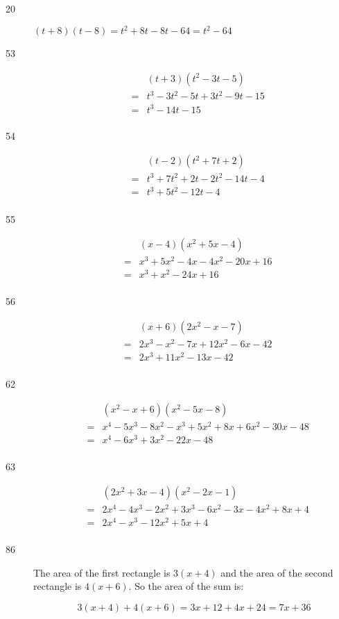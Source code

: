 \documentclass[fleqn,addpoints]{exam}
\begin{document}
\begin{description}
\item[20]
\( (t + 8)(t - 8) = t^2 + 8t - 8t - 64 = t^2 - 64 \)

\item[53]
\begin{eqnarray*}
  && (t + 3)(t^2 - 3t - 5) \\
  &=& t^3 - 3t^2 - 5t + 3t^2 - 9t - 15 \\
  &=& t^3 - 14t - 15 \\
\end{eqnarray*}

\item[54]
\begin{eqnarray*}
  && (t - 2)(t^2 + 7t + 2) \\
  &=& t^3 + 7t^2 + 2t - 2t^2 - 14t - 4 \\
  &=& t^3 + 5t^2 - 12t - 4 \\
\end{eqnarray*}

\item[55]
\begin{eqnarray*}
  && (x - 4)(x^2 + 5x -4) \\
  &=& x^3 + 5x^2 - 4x - 4x^2 - 20x + 16 \\
  &=& x^3 + x^2 - 24x + 16 \\
\end{eqnarray*}

\item[56]
\begin{eqnarray*}
  && (x+6)(2x^2 - x - 7) \\
  &=& 2x^3 - x^2 - 7x + 12x^2 - 6x - 42 \\
  &=& 2x^3 + 11x^2 - 13x - 42 \\
\end{eqnarray*}

\item[62]
\begin{eqnarray*}
  && (x^2 - x + 6)(x^2 - 5x - 8) \\
  &=& x^4 - 5x^3 - 8x^2 - x^3 + 5x^2 + 8x + 6x^2 - 30x - 48 \\
  &=& x^4 - 6x^3 + 3x^2 - 22x - 48 \\
\end{eqnarray*}

\item[63]
\begin{eqnarray*}
  && (2x^2 + 3x - 4)(x^2 - 2x - 1) \\
  &=& 2x^4 - 4x^3 - 2x^2 + 3x^3 - 6x^2 - 3x - 4x^2 + 8x + 4 \\
  &=& 2x^4 - x^3 - 12x^2 + 5x + 4 \\
\end{eqnarray*}

\item[86]

The area of the first rectangle is \( 3(x + 4) \) and the area of the second rectangle is \( 4(x + 6) \).
  So the area of the sum is:

\[ 3(x + 4) + 4(x + 6) = 3x + 12 + 4x + 24 = 7x + 36 \]

\end{description}
\fi
\end{document}
